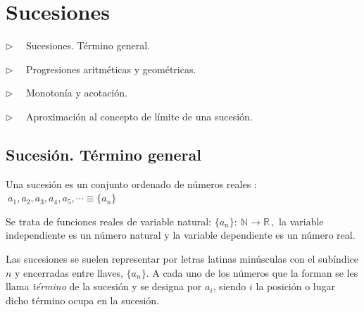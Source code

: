 \chapter{Sucesiones}


\vspace{15mm}


\begin{adjustwidth}{40pt}{40pt}
\begin{cuadro-gris}

	\begin{multicols}{2}
	$\triangleright \quad$  Sucesiones. Término general.
	
	$\triangleright \quad$  Progresiones aritméticas y geométricas.
	
	$\triangleright \quad$  Monotonía y acotación.
	
	$\triangleright \quad$  Aproximación al concepto de límite de una sucesión.
	\end{multicols}
	
\end{cuadro-gris}
\end{adjustwidth}



\vspace{5mm}
\section{Sucesión. Término general}
\vspace{0.5cm}

\begin{definition}[ Sucesión.]

Una sucesión es un conjunto ordenado de números reales :
                        $\  a_1, a_2, a_3, a_4, a_5, \cdots \equiv \{a_n\}$
                         
                         
\vspace{2mm} Se trata de funciones reales de variable natural: $\{a_n\}:\ \mathbb N \longrightarrow \mathbb R\, , $ la variable independiente es un número natural y la variable dependiente es un número real. 
                         
                         
\vspace{2mm} Las sucesiones se suelen representar por letras latinas minúsculas con el subíndice $n$ y encerradas entre llaves, $\{a_n\}$. A cada uno de los números que  la forman  se les llama \emph{término} de la sucesión y se designa por $a_i$, siendo  $i$  la posición o lugar dicho término ocupa  en la sucesión.
\end{definition}

